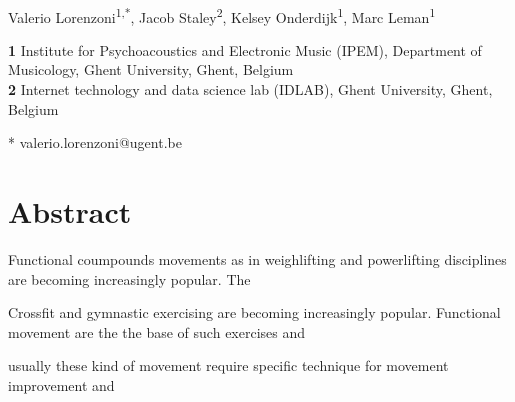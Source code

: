 \documentclass[10pt,letterpaper]{article}
\begin{document}
\vspace*{0.35in}

\begin{flushleft}
{\Large
\textbf{}
}
\newline
\\
Valerio Lorenzoni\textsuperscript{1,*},
Jacob Staley\textsuperscript{2},
Kelsey Onderdijk\textsuperscript{1},
Marc Leman\textsuperscript{1}

\bigskip

\textbf{1} Institute for Psychoacoustics and Electronic Music (IPEM), Department of Musicology, Ghent University, Ghent, Belgium
\\
\textbf{2}  Internet technology and data science lab (IDLAB), Ghent University, Ghent, Belgium
\\

\bigskip



* valerio.lorenzoni@ugent.be

\end{flushleft}

\section*{Abstract}

Functional coumpounds movements as in weighlifting and powerlifting disciplines are becoming increasingly popular. The 

Crossfit and gymnastic exercising are becoming increasingly popular. Functional movement are the the base of such exercises and 

usually these kind of movement require specific technique for movement improvement and 
\end{document}
